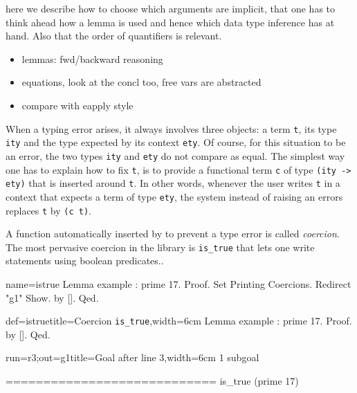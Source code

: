 here we describe how to choose which arguments are implicit,
that one has to think ahead how  a lemma is used and hence
which data type inference has at hand.  Also that the order
of quantifiers is relevant.
\begin{itemize}
\item lemmas: fwd/backward reasoning
\item equations, look at the concl too, free vars are abstracted
\item compare with eapply style
\end{itemize}

\mcbREQUIRE{}
\mcbPROVIDE{}


When a typing error arises, it always involves three objects:
a term \lstinline/t/, its type \lstinline/ity/ and the type
expected by its context \lstinline/ety/.  Of course, for this
situation to be an error, the two types \lstinline/ity/ and
\lstinline/ety/ do not compare as equal.
The simplest way one has to explain \Coq{} how to fix \lstinline/t/,
is to provide a functional term \lstinline/c/ of type
\lstinline/(ity -> ety)/ that is inserted around \lstinline/t/.
In other words, whenever the user writes \lstinline/t/ in a context
that expects a term of type \lstinline/ety/, the system instead of
raising an errors replaces \lstinline/t/ by \lstinline/(c t)/.

A function automatically inserted by \Coq{} to prevent a type
error is called \emph{coercion}.
The most pervasive coercion in the \mcbMC{} library is
\lstinline/is_true/ that lets one write statements using boolean
predicates..

\begin{coqdef}{name=istrue}
Lemma example : prime 17.
Proof.
Set Printing Coercions. Redirect "g1" Show.
by [].
Qed.
\end{coqdef}
\begin{coq}{def=istrue}{title=Coercion \lstinline/is_true/,width=6cm}
Lemma example : prime 17.
Proof.  by [].  Qed.
\end{coq}
\begin{coqout}{run=r3;out=g1}{title=Goal after line 3,width=6cm}
1 subgoal

============================
is_true (prime 17)
\end{coqout}

